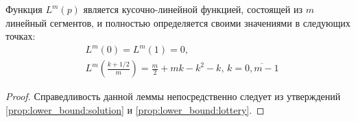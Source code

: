 \begin{lemma}
\label{lemma:lower_bound:function}
Функция $ L^m(p) $ является кусочно-линейной функцией, состоящей из $ m $ линейный сегментов, и полностью определяется своими значениями в следующих точках:
\begin{eqnarray*}
& L^m(0) = L^m(1) = 0, \\
& L^m\left(\frac{k+1/2}{m}\right) 
    = \frac{m}{2} + mk - k^2 - k, 
        \, k = \overline{0, m - 1}
\end{eqnarray*}
\end{lemma}
\begin{proof}
Справедливость данной леммы непосредственно следует из утверждений \ref{prop:lower_bound:solution} и \ref{prop:lower_bound:lottery}.
\end{proof}